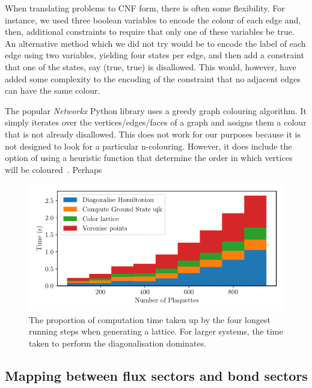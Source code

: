 When translating problems to CNF form, there is often some flexibility. For instance, we used three boolean variables to encode the colour of each edge and, then, additional constraints to require that only one of these variables be true. An alternative method which we did not try would be to encode the label of each edge using two variables, yielding four states per edge, and then add a constraint that one of the states, say (true, true) is disallowed. This would, however, have added some complexity to the encoding of the constraint that no adjacent edges can have the same colour.

The popular \emph{Networkx} Python library uses a greedy graph colouring algorithm. It simply iterates over the vertices/edges/faces of a graph and assigns them a colour that is not already disallowed. This does not work for our purposes because it is not designed to look for a particular n-colouring. However, it does include the option of using a heuristic function that determine the order in which vertices will be coloured~\autocite{kosowski2004classical,matulaSmallestlastOrderingClustering1983}. Perhaps

\hypertarget{fig:times}{%
\begin{figure}
\centering
\includegraphics[width=1\textwidth,height=\textheight]{figure_code/amk_chapter/methods/times/times}
\caption[{Computation Time Spent on Different Procedures.}]{The proportion of computation time taken up by the four longest running steps when generating a lattice. For larger systems, the time taken to perform the diagonalisation dominates.}
\label{fig:times}
\end{figure}
}

\hypertarget{mapping-between-flux-sectors-and-bond-sectors}{%
\subsection{Mapping between flux sectors and bond sectors}\label{mapping-between-flux-sectors-and-bond-sectors}}


